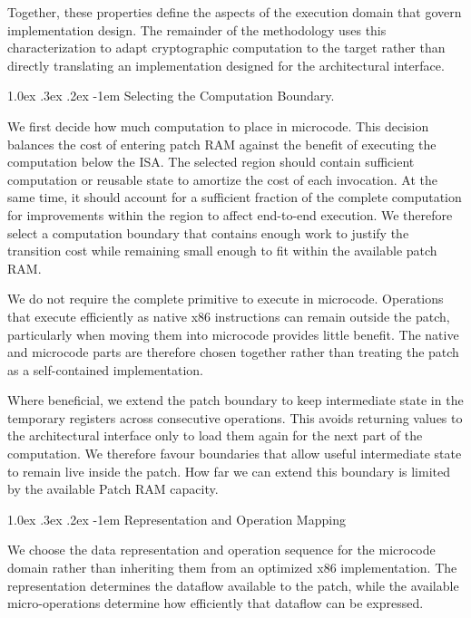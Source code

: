 \documentclass[journal=tches,submission]{iacrtrans}
\makeatletter
\renewcommand\paragraph{\@startsection{paragraph}{4}{\z@}%
      {1.0ex \@plus .3ex \@minus .2ex}%
      {-1em}%
      {\normalfont\normalsize\bfseries\SS@parafont}}
\makeatother
\begin{document}
Together, these properties define the aspects of the execution domain that govern implementation design. 
The remainder of the methodology uses this characterization to adapt cryptographic computation to the target rather than directly translating an implementation designed for the architectural interface.

\paragraph{Selecting the Computation Boundary.}
\label{sec:method-granularity}

We first decide how much computation to place in microcode.
This decision balances the cost of entering patch RAM against the benefit of executing the computation below the ISA.
The selected region should contain sufficient computation or reusable state to amortize the cost of each invocation. 
At the same time, it should account for a sufficient fraction of the complete computation for improvements within the region to affect end-to-end execution.
We therefore select a computation boundary that contains enough work to justify the transition cost while remaining small enough to fit within the available patch RAM.

We do not require the complete primitive to execute in microcode.
Operations that execute efficiently as native x86 instructions can remain outside the patch, particularly when moving them into microcode provides little benefit.
The native and microcode parts are therefore chosen together rather than treating the patch as a self-contained implementation.

Where beneficial, we extend the patch boundary to keep intermediate state in the temporary registers across consecutive operations.
This avoids returning values to the architectural interface only to load them again for the next part of the computation.
We therefore favour boundaries that allow useful intermediate state to remain live inside the patch.
How far we can extend this boundary is limited by the available Patch RAM capacity.

\paragraph{Representation and Operation Mapping}
\label{sec:method-representation}

We choose the data representation and operation sequence for the microcode domain rather than inheriting them from an optimized x86 implementation.
The representation determines the dataflow available to the patch, while the available micro-operations determine how efficiently that dataflow can be expressed.
\end{document}
